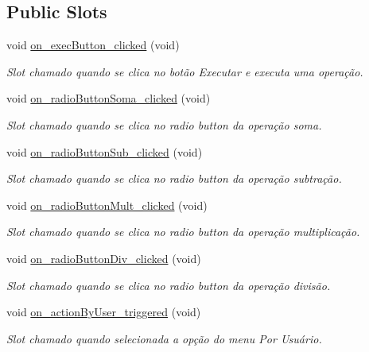 \subsection*{Public Slots}
\begin{DoxyCompactItemize}
\item 
void \hyperlink{classMyCalcWindow_a6fdaf67619d3127503232c656e712656}{on\+\_\+exec\+Button\+\_\+clicked} (void)
\begin{DoxyCompactList}\small\item\em Slot chamado quando se clica no botão \textquotesingle{}Executar\textquotesingle{} e executa uma operação. \end{DoxyCompactList}\item 
void \hyperlink{classMyCalcWindow_a751fb8b918aa9e737268bae50010681d}{on\+\_\+radio\+Button\+Soma\+\_\+clicked} (void)
\begin{DoxyCompactList}\small\item\em Slot chamado quando se clica no radio button da operação soma. \end{DoxyCompactList}\item 
void \hyperlink{classMyCalcWindow_a01fac328f5546feb830a67a7d35cc7f5}{on\+\_\+radio\+Button\+Sub\+\_\+clicked} (void)
\begin{DoxyCompactList}\small\item\em Slot chamado quando se clica no radio button da operação subtração. \end{DoxyCompactList}\item 
void \hyperlink{classMyCalcWindow_a553593de7766d99faf23a2053ddb4281}{on\+\_\+radio\+Button\+Mult\+\_\+clicked} (void)
\begin{DoxyCompactList}\small\item\em Slot chamado quando se clica no radio button da operação multiplicação. \end{DoxyCompactList}\item 
void \hyperlink{classMyCalcWindow_a1ac314ac5a743effc49465a295f796a4}{on\+\_\+radio\+Button\+Div\+\_\+clicked} (void)
\begin{DoxyCompactList}\small\item\em Slot chamado quando se clica no radio button da operação divisão. \end{DoxyCompactList}\item 
void \hyperlink{classMyCalcWindow_ad018832daea504f486bc1cb26f5cb0ec}{on\+\_\+action\+By\+User\+\_\+triggered} (void)
\begin{DoxyCompactList}\small\item\em Slot chamado quando selecionada a opção do menu \textquotesingle{}Por Usuário\textquotesingle{}. \end{DoxyCompactList}\item 

\end{DoxyCompactItemize}
